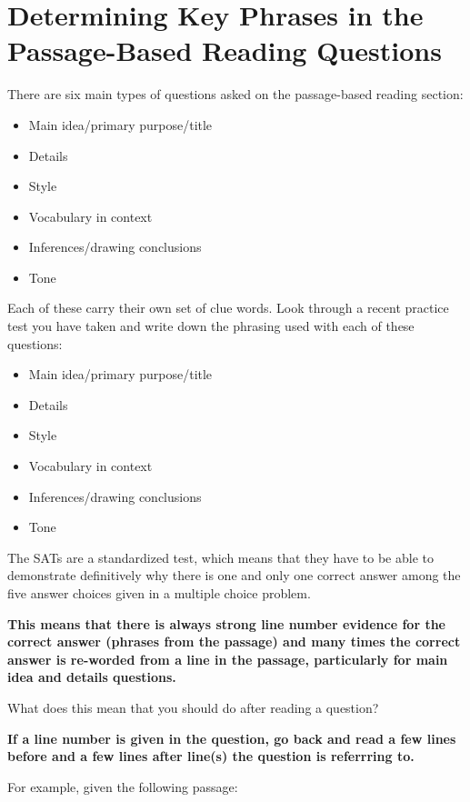 \section{Determining Key Phrases in the Passage-Based Reading Questions}

There are six main types of questions asked on the passage-based reading section:

\begin{itemize}
\item Main idea/primary purpose/title
\item Details
\item Style
\item Vocabulary in context
\item Inferences/drawing conclusions
\item Tone
\end{itemize}

Each of these carry their own set of clue words. Look through a recent practice test you have taken and write down the phrasing used with each of these questions:

\begin{itemize}
\item Main idea/primary purpose/title \hrulefill
\item Details \hrulefill
\item Style \hrulefill
\item Vocabulary in context \hrulefill
\item Inferences/drawing conclusions \hrulefill
\item Tone \hrulefill
\end{itemize}

The SATs are a standardized test, which means that they have to be able to demonstrate definitively why there is one and only one correct answer among the five answer choices given in a multiple choice problem. 

\large{\textbf{This means that there is always strong line number evidence for the correct answer (phrases from the passage) and many times the correct answer is re-worded from a line in the passage, particularly for main idea and details questions.}} 

What does this mean that you should do after reading a question?

\large{\textbf{If a line number is given in the question, go back and read a few lines before and a few lines after line(s) the question is referrring to.}}

For example, given the following passage:

